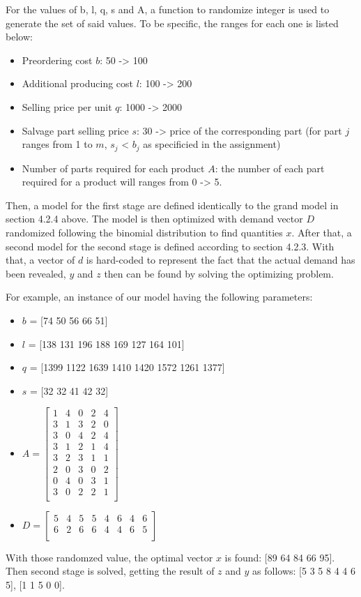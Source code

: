 		\qquad For the values of b, l, q, s and A, a function to randomize integer is used to generate the set of said values. To be specific, the ranges for each one is listed below:

		\begin{itemize}
			\item Preordering cost $b$: 50 -> 100
			\item Additional producing cost $l$: 100 -> 200
			\item Selling price per unit $q$: 1000 -> 2000
			\item Salvage part selling price $s$: 30 -> price of the corresponding part (for part $j$ ranges from 1 to $m$, $s_j$ < $b_j$ as specificied in the assignment)
			\item Number of parts required for each product $A$: the number of each part required for a product will ranges from 0 -> 5.
		\end{itemize}

		\qquad Then, a model for the first stage are defined identically to the grand model in section 4.2.4 above. The model is then optimized with demand vector $D$ randomized following the binomial distribution to find quantities $x$. After that, a second model for the second stage is defined according to section 4.2.3. With that, a vector of $d$ is hard-coded to represent the fact that the actual demand has been revealed, $y$ and $z$ then can be found by solving the optimizing problem.

		\qquad For example, an instance of our model having the following parameters:

		\begin{itemize}
			\item $b$ = [74 50 56 66 51]
			\item $l$ = [138 131 196 188 169 127 164 101]
			\item $q$ = [1399 1122 1639 1410 1420 1572 1261 1377]
			\item $s$ = [32 32 41 42 32]
			\item $A = 	\begin{bmatrix}
							1 & 4 & 0 & 2 & 4 \\
							3 & 1 & 3 & 2 & 0 \\
							3 & 0 & 4 & 2 & 4 \\
							3 & 1 & 2 & 1 & 4 \\
							3 & 2 & 3 & 1 & 1 \\
							2 & 0 & 3 & 0 & 2 \\
							0 & 4 & 0 & 3 & 1 \\
							3 & 0 & 2 & 2 & 1 \\
						\end{bmatrix}$
			\item $D = 	\begin{bmatrix}
							5 & 4 & 5 & 5 & 4 & 6 & 4 & 6 \\
							6 & 2 & 6 & 6 & 4 & 4 & 6 & 5 \\
						\end{bmatrix}$
		\end{itemize}

		\qquad With those randomzed value, the optimal vector $x$ is found: [89 64 84 66 95]. Then second stage is solved, getting the result of $z$ and $y$ as follows: [5 3 5 8 4 4 6 5], [1 1 5 0 0].
